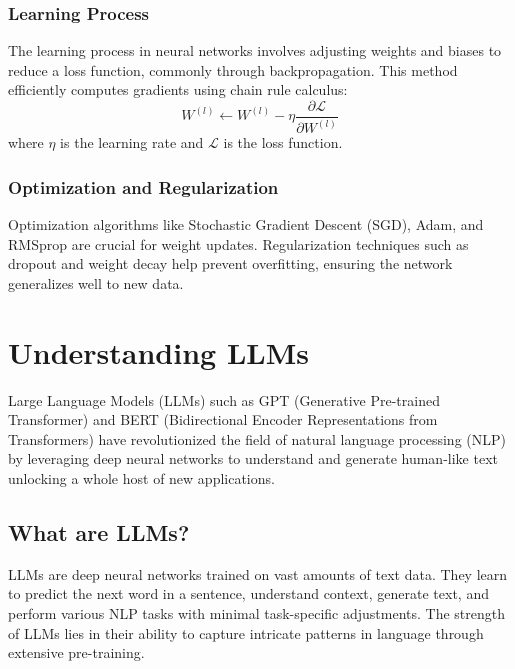     \subsubsection{Learning Process}
    The learning process in neural networks involves adjusting weights and biases to reduce a loss function, commonly through backpropagation. This method efficiently computes gradients using chain rule calculus:
    \begin{equation}
        W^{(l)} \leftarrow W^{(l)} - \eta \frac{\partial \mathcal{L}}{\partial W^{(l)}}
    \end{equation}
    where $\eta$ is the learning rate and $\mathcal{L}$ is the loss function.
    
    \subsubsection{Optimization and Regularization}
    Optimization algorithms like Stochastic Gradient Descent (SGD), Adam, and RMSprop are crucial for weight updates. Regularization techniques such as dropout and weight decay help prevent overfitting, ensuring the network generalizes well to new data.
    


\section{Understanding LLMs}
    Large Language Models (LLMs) such as GPT (Generative Pre-trained Transformer) and BERT (Bidirectional Encoder Representations from Transformers) have revolutionized the field of natural language processing (NLP) by leveraging deep neural networks to understand and generate human-like text unlocking a whole host of new applications.


    \subsection{What are LLMs?}
        LLMs are deep neural networks trained on vast amounts of text data. They learn to predict the next word in a sentence, understand context, generate text, and perform various NLP tasks with minimal task-specific adjustments. The strength of LLMs lies in their ability to capture intricate patterns in language through extensive pre-training.
       
       
